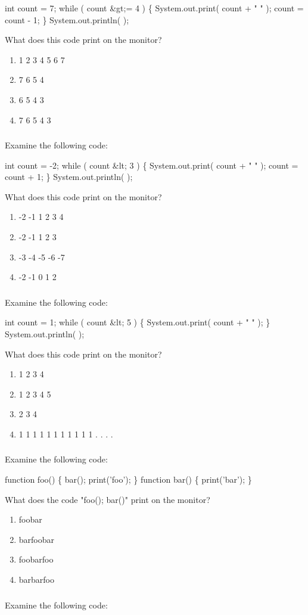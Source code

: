 int count = 7; 
 while ( count \&gt;= 4 ) 
 \{ 
 System.out.print( count + " " ); 
 count = count - 1; 
\} 
 System.out.println(  ); 

 What does this code print on the monitor? \begin{enumerate}  \item 1 2 3 4 5 6 7 \item 7 6 5 4 \item 6 5 4 3 \item 7 6 5 4 3 \end{enumerate}  \subsubsection{} Examine the following code: 

 int count = -2; 
 while ( count \&lt; 3 ) 
 \{ 
 System.out.print( count + " " ); 
 count = count + 1; 
\} 
 System.out.println(  ); 

 What does this code print on the monitor? \begin{enumerate}  \item -2 -1 1 2 3 4 \item -2 -1 1 2 3 \item -3 -4 -5 -6 -7 \item -2 -1 0 1 2 \end{enumerate}  \subsubsection{} Examine the following code: 

 int count = 1; 
 while ( count \&lt; 5 ) 
 \{ 
 System.out.print( count + " " ); 
\} 
 System.out.println(  ); 

 What does this code print on the monitor? \begin{enumerate}  \item 1 2 3 4 \item 1 2 3 4 5 \item 2 3 4 \item 1 1 1 1 1 1 1 1 1 1 1 . . . . \end{enumerate}  \subsubsection{} Examine the following code: 

 function foo() \{ 
 bar(); 
 print('foo'); 
 \} 
 function bar() \{ 
print('bar'); 
 \} 

 What does the code "foo(); bar()"  print on the monitor? \begin{enumerate}  \item foobar \item barfoobar \item foobarfoo \item barbarfoo \end{enumerate}  \subsubsection{} Examine the following code: 

